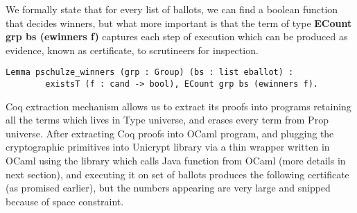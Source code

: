 \documentclass{llncs}
\begin{document}
We formally state that for every list of ballots, we can find a boolean function 
that decides winners, but what more important is that the term 
of type \textbf{ECount grp bs (ewinners f)} captures each step of 
execution which can be produced as evidence, known as certificate, 
to scrutineers for inspection.

\begin{verbatim}
Lemma pschulze_winners (grp : Group) (bs : list eballot) :
        existsT (f : cand -> bool), ECount grp bs (ewinners f).
\end{verbatim}

Coq extraction mechanism\cite{Letouzey:2003:NEC} allows us to extract its proofs into
programs retaining all the terms which lives in Type universe, and erases every term 
from Prop universe. After extracting Coq proofs into OCaml\cite{Leroy:2013:ORM} program, and plugging the 
cryptographic primitives into Unicrypt library via a thin wrapper written in 
OCaml using the library which calls Java function from OCaml (more details in next
section), and executing it on 
set of ballots produces the following certificate (as promised earlier), but 
the numbers appearing are very large and snipped because of space constraint.
\end{document}
